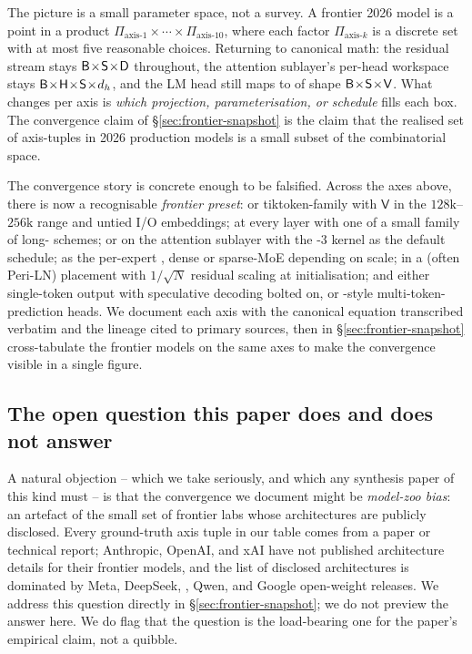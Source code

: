 \begin{intuition}
The picture is a small parameter space, not a survey. A frontier 2026
model is a point in a product
$\Pi_{\text{axis-1}} \times \cdots \times \Pi_{\text{axis-10}}$,
where each factor $\Pi_{\text{axis-}k}$ is a discrete set with at most
five reasonable choices. Returning to canonical math: the residual
stream stays $\mathsf{B}\!\times\!\mathsf{S}\!\times\!\mathsf{D}$ throughout, the attention sublayer's per-head
workspace stays $\mathsf{B}\!\times\!\mathsf{H}\!\times\!\mathsf{S}\!\times\!d_h$, and the LM head still maps to  of
shape $\mathsf{B}\!\times\!\mathsf{S}\!\times\!\mathsf{V}$. What changes per axis is \emph{which projection,
parameterisation, or schedule} fills each box. The convergence claim
of \S\ref{sec:frontier-snapshot} is the claim that the realised set
of axis-tuples in 2026 production models is a small subset of the
combinatorial space.
\end{intuition}

The convergence story is concrete enough to be falsified. Across the
axes above, there is now a recognisable \emph{frontier preset}:
 or tiktoken-family  with $\mathsf{V}$ in the
$128\text{k}$--$256\text{k}$ range and untied I/O embeddings;  at
every layer with one of a small family of long-
schemes;  or  on the attention sublayer with the -3
kernel as the default schedule;  as the per-expert , dense or
sparse-MoE depending on scale;  in a  (often Peri-LN)
placement with $1/\sqrt{N}$ residual scaling at initialisation; and
either single-token output with speculative decoding bolted on, or
-style multi-token-prediction heads. We document each axis
with the canonical equation transcribed verbatim and the lineage cited
to primary sources, then in \S\ref{sec:frontier-snapshot} cross-tabulate
the frontier models on the same axes to make the convergence visible
in a single figure.

\subsection*{The open question this paper does and does not answer}

A natural objection -- which we take seriously, and which any
synthesis paper of this kind must -- is that the convergence we
document might be \emph{model-zoo bias}: an artefact of the small set
of frontier labs whose architectures are publicly disclosed. Every
ground-truth axis tuple in our table comes from a paper or technical
report; Anthropic, OpenAI, and xAI have not published architecture
details for their frontier models, and the list of disclosed
architectures is dominated by Meta, DeepSeek, , Qwen, and
Google open-weight releases. We address this question directly in
\S\ref{sec:frontier-snapshot}; we do not preview the answer here. We
do flag that the question is the load-bearing one for the paper's
empirical claim, not a quibble.

